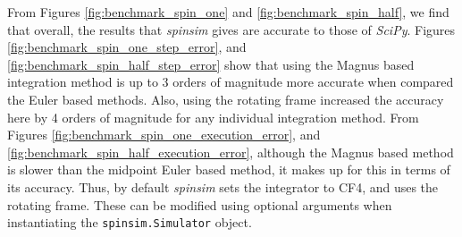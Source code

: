 \documentclass{jors}
\begin{document}
		From Figures \ref{fig:benchmark_spin_one} and \ref{fig:benchmark_spin_half}, we find that overall, the results that \emph{spinsim} gives are accurate to those of \emph{SciPy}.
		Figures \ref{fig:benchmark_spin_one_step_error}, and \ref{fig:benchmark_spin_half_step_error} show that using the Magnus based integration method is up to 3 orders of magnitude more accurate when compared the Euler based methods.
		Also, using the rotating frame increased the accuracy here by 4 orders of magnitude for any individual integration method.
		From Figures \ref{fig:benchmark_spin_one_execution_error}, and \ref{fig:benchmark_spin_half_execution_error}, although the Magnus based method is slower than the midpoint Euler based method, it makes up for this in terms of its accuracy.
		Thus, by default \emph{spinsim} sets the integrator to CF4, and uses the rotating frame.
		These can be modified using optional arguments when instantiating the \texttt{spinsim.Simulator} object.
\end{document}
